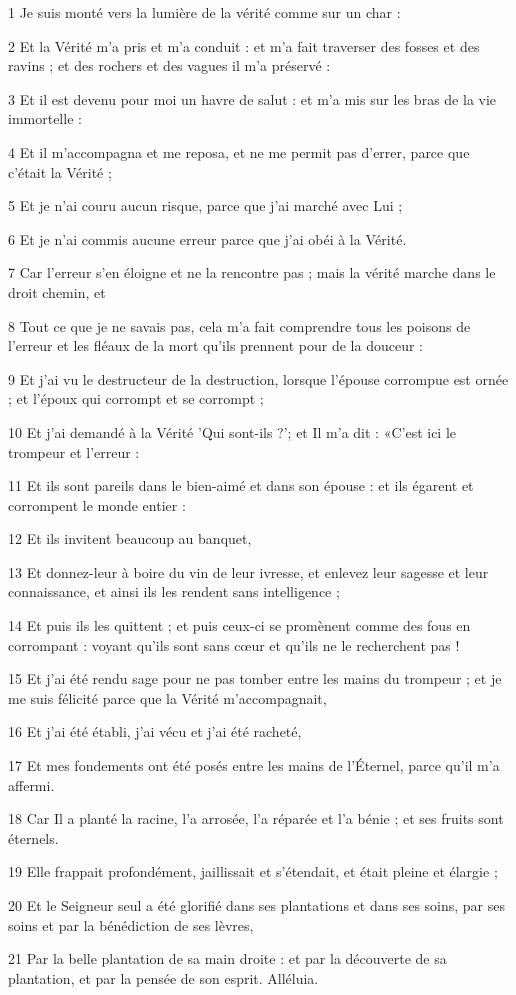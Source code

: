\par 1 Je suis monté vers la lumière de la vérité comme sur un char :
\par 2 Et la Vérité m'a pris et m'a conduit : et m'a fait traverser des fosses et des ravins ; et des rochers et des vagues il m'a préservé :
\par 3 Et il est devenu pour moi un havre de salut : et m'a mis sur les bras de la vie immortelle :
\par 4 Et il m'accompagna et me reposa, et ne me permit pas d'errer, parce que c'était la Vérité ;
\par 5 Et je n'ai couru aucun risque, parce que j'ai marché avec Lui ;
\par 6 Et je n'ai commis aucune erreur parce que j'ai obéi à la Vérité.
\par 7 Car l'erreur s'en éloigne et ne la rencontre pas ; mais la vérité marche dans le droit chemin, et
\par 8 Tout ce que je ne savais pas, cela m'a fait comprendre tous les poisons de l'erreur et les fléaux de la mort qu'ils prennent pour de la douceur :
\par 9 Et j'ai vu le destructeur de la destruction, lorsque l'épouse corrompue est ornée ; et l'époux qui corrompt et se corrompt ;
\par 10 Et j'ai demandé à la Vérité 'Qui sont-ils ?'; et Il m'a dit : «C'est ici le trompeur et l'erreur :
\par 11 Et ils sont pareils dans le bien-aimé et dans son épouse : et ils égarent et corrompent le monde entier :
\par 12 Et ils invitent beaucoup au banquet,
\par 13 Et donnez-leur à boire du vin de leur ivresse, et enlevez leur sagesse et leur connaissance, et ainsi ils les rendent sans intelligence ;
\par 14 Et puis ils les quittent ; et puis ceux-ci se promènent comme des fous en corrompant : voyant qu'ils sont sans cœur et qu'ils ne le recherchent pas !
\par 15 Et j'ai été rendu sage pour ne pas tomber entre les mains du trompeur ; et je me suis félicité parce que la Vérité m'accompagnait,
\par 16 Et j'ai été établi, j'ai vécu et j'ai été racheté,
\par 17 Et mes fondements ont été posés entre les mains de l'Éternel, parce qu'il m'a affermi.
\par 18 Car Il a planté la racine, l'a arrosée, l'a réparée et l'a bénie ; et ses fruits sont éternels.
\par 19 Elle frappait profondément, jaillissait et s'étendait, et était pleine et élargie ;
\par 20 Et le Seigneur seul a été glorifié dans ses plantations et dans ses soins, par ses soins et par la bénédiction de ses lèvres,
\par 21 Par la belle plantation de sa main droite : et par la découverte de sa plantation, et par la pensée de son esprit. Alléluia.

